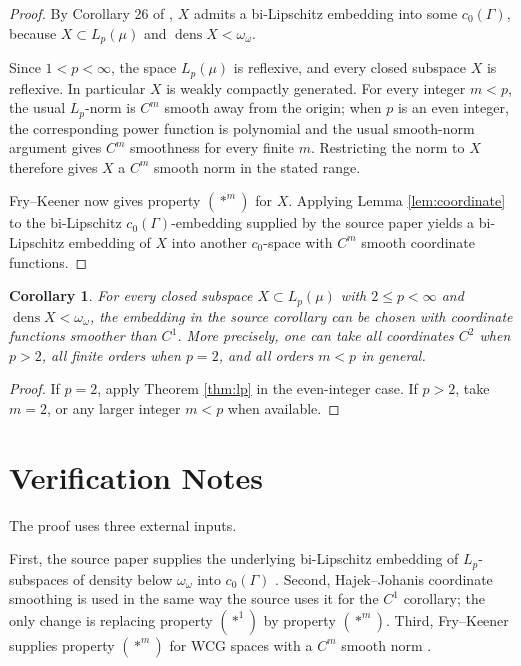 \documentclass[11pt]{article}
\newtheorem{corollary}{Corollary}
\newcommand{\dens}{\operatorname{dens}}
\begin{document}
\begin{proof}
By Corollary 26 of \cite{HJS240100831}, \(X\) admits a bi-Lipschitz embedding
into some \(c_0(\Gamma)\), because \(X\subset L_p(\mu)\) and
\(\dens X<\omega_\omega\).

Since \(1<p<\infty\), the space \(L_p(\mu)\) is reflexive, and every closed
subspace \(X\) is reflexive.  In particular \(X\) is weakly compactly
generated.  For every integer \(m<p\), the usual \(L_p\)-norm is \(C^m\)
smooth away from the origin; when \(p\) is an even integer, the corresponding
power function is polynomial and the usual smooth-norm argument gives
\(C^m\) smoothness for every finite \(m\).  Restricting the norm to \(X\)
therefore gives \(X\) a \(C^m\) smooth norm in the stated range.

Fry--Keener \cite[Theorem 4]{FryKeener09070241} now gives property
\((\ast^m)\) for \(X\).  Applying Lemma \ref{lem:coordinate} to the
bi-Lipschitz \(c_0(\Gamma)\)-embedding supplied by the source paper yields a
bi-Lipschitz embedding of \(X\) into another \(c_0\)-space with \(C^m\) smooth
coordinate functions.
\end{proof}

\begin{corollary}
For every closed subspace \(X\subset L_p(\mu)\) with \(2\leq p<\infty\) and
\(\dens X<\omega_\omega\), the embedding in the source corollary can be chosen
with coordinate functions smoother than \(C^1\).  More precisely, one can take
all coordinates \(C^2\) when \(p>2\), all finite orders when \(p=2\), and all
orders \(m<p\) in general.
\end{corollary}

\begin{proof}
If \(p=2\), apply Theorem \ref{thm:lp} in the even-integer case.  If \(p>2\),
take \(m=2\), or any larger integer \(m<p\) when available.
\end{proof}

\section*{Verification Notes}

The proof uses three external inputs.

First, the source paper supplies the underlying bi-Lipschitz embedding of
\(L_p\)-subspaces of density below \(\omega_\omega\) into \(c_0(\Gamma)\)
\cite[Corollary 26]{HJS240100831}.  Second, Hajek--Johanis coordinate
smoothing is used in the same way the source uses it for the \(C^1\) corollary;
the only change is replacing property \((\ast^1)\) by property \((\ast^m)\).
Third, Fry--Keener supplies property \((\ast^m)\) for WCG spaces with a
\(C^m\) smooth norm \cite[Theorem 4]{FryKeener09070241}.
\end{document}
